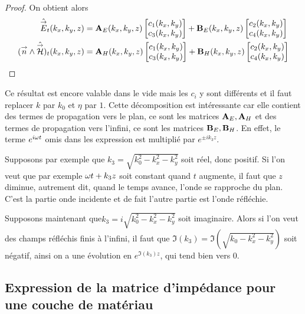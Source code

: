 \begin{proof}
            On obtient alors
            \begin{align}
                \hat{{\overset{\rightarrow}{E}}}_t(k_x,k_y,z) &= \mathbf{A}_E(k_x,k_y,z) \begin{bmatrix}c_1(k_x,k_y) \\ c_3(k_x,k_y)\end{bmatrix} + \mathbf{B}_E(k_x,k_y,z) \begin{bmatrix}c_2(k_x,k_y) \\ c_4(k_x,k_y)\end{bmatrix}
                \\
                ({\overset{\rightarrow}{n}} \wedge \hat{{\overset{\rightarrow}{\mathcal{H}}}})_t(k_x,k_y,z) &= \mathbf{A}_H(k_x,k_y,z) \begin{bmatrix}c_1(k_x,k_y) \\ c_3(k_x,k_y)\end{bmatrix} + \mathbf{B}_H(k_x,k_y,z) \begin{bmatrix}c_2(k_x,k_y) \\ c_4(k_x,k_y)\end{bmatrix}
            \end{align}

        \end{proof}

        Ce résultat est encore valable dans le vide mais les \(c_i\) y sont différents et il faut replacer \(k\) par \(k_0\) et \(\eta\) par \(1\).
        Cette décomposition est intéressante car elle contient des termes de propagation vers le plan, ce sont les matrices \(\mathbf{A}_E, \mathbf{A}_H\) et des termes de propagation vers l'infini, ce sont les matrices \(\mathbf{B}_E, \mathbf{B}_H\). En effet, le terme \(e^{i\omega t}\) omis dans les expression est multiplié par \(e^{\pm i k_3 z}\). 

        Supposons par exemple que \(k_3 = \sqrt{k_0^2 - k_x^2 - k_y^2}\) soit réel, donc positif. Si l'on veut que par exemple \(\omega t + k_3 z\) soit constant quand \(t\) augmente, il faut que \(z\) diminue, autrement dit, quand le temps avance, l'onde se rapproche du plan. C'est la partie onde incidente et de fait l'autre partie est l'onde réfléchie.

        Supposons maintenant que\(k_3 = i\sqrt{k_0^2 - k_x^2 - k_y^2}\)  soit imaginaire. Alors si l'on veut des champs réfléchis finis à l'infini, il faut que \(\Im(k_3) = \Im(\sqrt{k_0 - k_x^2 - k_y^2})\) soit négatif, ainsi on a une évolution en \(e^{\Im(k_3)z}\), qui tend bien vers \(0\).

    \subsection{Expression de la matrice d'impédance pour une couche de matériau}

